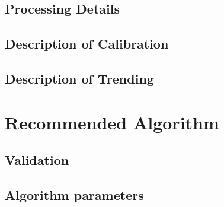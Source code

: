 \documentclass{article}
\begin{document}
\subsection{Processing Details}

\subsection{Description of Calibration}

\subsection{Description of Trending}

\section{Recommended Algorithm}

\subsection{Validation}

\subsection{Algorithm parameters}


\end{document}
